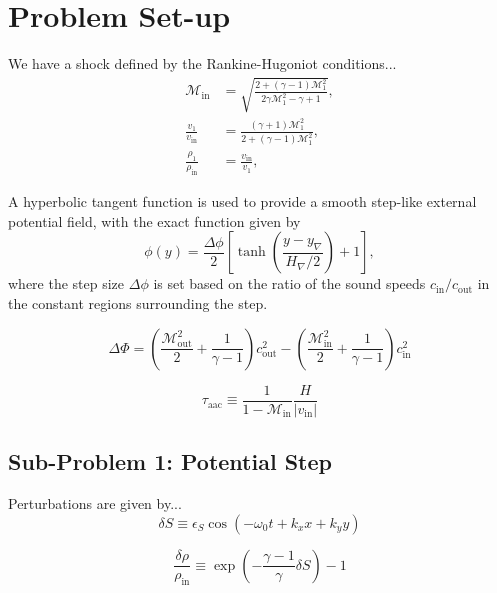 \section{Problem Set-up}
\label{sec:TP_set_up}

We have a shock defined by the Rankine-Hugoniot conditions...
\begin{align}
\mathcal{M}_\textrm{in}&=\sqrt{\frac{2+(\gamma-1)\mathcal{M}_1^2}{2\gamma\mathcal{M}_1^2-\gamma+1}},\\
\frac{v_1}{v_\textrm{in}}&=\frac{(\gamma+1)\mathcal{M}_1^2}{2+(\gamma-1)\mathcal{M}_1^2},\\
\frac{\rho_1}{\rho_\textrm{in}}&=\frac{v_\textrm{in}}{v_1},
\end{align}

A hyperbolic tangent function is used to provide a smooth step-like external potential field, with the exact function given by
\begin{equation}
\phi(y)=\frac{\Delta\phi}{2}\left[\tanh\left(\frac{y-y_{\nabla}}{H_{\nabla}/2}\right)+1\right],
\end{equation}
where the step size $\Delta\phi$ is set based on the ratio of the sound speeds $c_{\textrm{in}}/c_{\textrm{out}}$ in the constant regions surrounding the step.

\begin{equation}
\Delta\Phi=\left(\frac{\mathcal{M}_\textrm{out}^2}{2}+\frac{1}{\gamma-1}\right)c_\textrm{out}^2-\left(\frac{\mathcal{M}_\textrm{in}^2}{2}+\frac{1}{\gamma-1}\right)c_\textrm{in}^2
\end{equation}

\begin{equation}
\tau_\textrm{aac}\equiv\frac{1}{1-\mathcal{M}_\textrm{in}}\frac{H}{|v_\textrm{in}|}
\end{equation}

\subsection{Sub-Problem 1: Potential Step}
\label{subsec:sub_problem_1}

Perturbations are given by...
\begin{equation}
\delta S\equiv\epsilon_S\cos\left(-\omega_0t+k_xx+k_yy\right)
\end{equation}

\begin{equation}
\frac{\delta \rho}{\rho_\textrm{in}}\equiv\exp\left(-\frac{\gamma-1}{\gamma}\delta S\right)-1
\end{equation}

